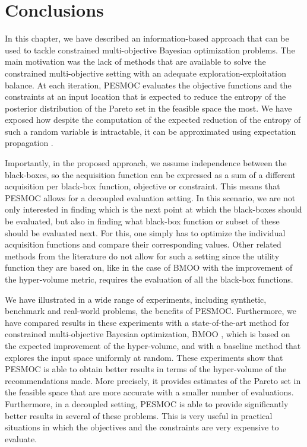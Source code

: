 \section{Conclusions} \label{seq-conclusions_pesmoc}

In this chapter, we have described an information-based approach that can be used to tackle constrained multi-objective Bayesian optimization problems. The main motivation was the lack of methods that are available to solve the
constrained multi-objective setting with an adequate exploration-exploitation balance. At each iteration, PESMOC evaluates the objective functions and the constraints at an input location that is expected to reduce the entropy of the posterior distribution of the Pareto set in the feasible space the most. We have exposed how despite the computation of the expected reduction of the entropy of such a random variable is intractable, it can be approximated using expectation propagation \citep{minka2001expectation}.

Importantly, in the proposed approach, we assume independence between the black-boxes, so the acquisition function can be expressed
as a sum of a different acquisition per black-box function, objective or constraint. This means that PESMOC allows for a decoupled evaluation setting. In this scenario, we are
not only interested in finding which is the next point at which the black-boxes should
be evaluated, but also in finding what black-box function or subset of these should be evaluated
next. For this, one simply has to optimize the individual acquisition functions and compare their
corresponding values. Other related methods from the literature do not allow for such a setting
since the utility function they are based on, like in the case of BMOO with the improvement of the hyper-volume metric, requires the evaluation of all the black-box functions.

We have illustrated in a wide range of experiments, including synthetic, benchmark and real-world problems, the benefits of PESMOC. Furthermore, we have compared results in these experiments with
a state-of-the-art method for constrained multi-objective Bayesian optimization, BMOO \citep{feliot2015bayesian},
which is based on the expected improvement of the hyper-volume, and with a baseline method that explores the input space uniformly at random. These experiments show that PESMOC is able to obtain better results in terms of the hyper-volume of the recommendations made. More precisely, it provides estimates of the Pareto set in the feasible space that are more accurate with a smaller number of evaluations. Furthermore, in a decoupled setting, PESMOC is able to provide significantly better results in several of these problems. This is very
useful in practical situations in which the objectives and the constraints are very expensive to evaluate.

